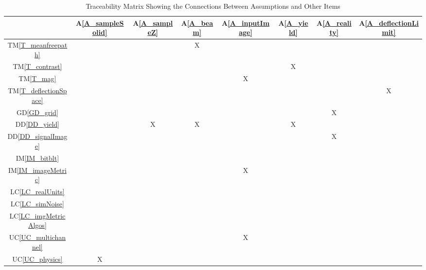 \documentclass[12pt]{article}
\newcommand{\dref}[1]{GD\ref{#1}}
\newcommand{\ddref}[1]{DD\ref{#1}}
\newcommand{\tref}[1]{TM\ref{#1}}
\newcommand{\aref}[1]{A\ref{#1}}
\newcommand{\iref}[1]{IM\ref{#1}}
\newcommand{\lcref}[1]{LC\ref{#1}}
\newcommand{\ucref}[1]{UC\ref{#1}}
\begin{document}
\begin{table}[h!]
\centering
\begin{tabular}{|c|c|c|c|c|c|c|c|}
\hline
	& \aref{A_sampleSolid}
	& \aref{A_sampleZ}
	& \aref{A_beam}
	& \aref{A_inputImage}
	& \aref{A_yield}
	& \aref{A_reality}
	& \aref{A_deflectionLimit}
\\ \hline
\tref{T_meanfreepath}      & & &X& & & & \\ \hline
\tref{T_contrast}          & & & & &X& & \\ \hline
\tref{T_mag}               & & & &X& & & \\ \hline
\tref{T_deflectionSpace}   & & & & & & &X\\ \hline
\dref{GD_grid}             & & & & & &X& \\ \hline
\ddref{DD_yield}           & &X&X& &X& & \\ \hline
\ddref{DD_signalImage}     & & & & & &X& \\ \hline
\iref{IM_bitblt}           & & & & & & & \\ \hline
\iref{IM_imageMetric}      & & & &X& & & \\ \hline
\lcref{LC_realUnits}       & & & & & & & \\ \hline
\lcref{LC_simNoise}        & & & & & & & \\ \hline
\lcref{LC_imgMetricAlgos}  & & & & & & & \\ \hline
\ucref{UC_multichannel}    & & & &X& & & \\ \hline
\ucref{UC_physics}         &X& & & & & & \\ \hline
\end{tabular}
\caption{Traceability Matrix Showing the Connections Between Assumptions and Other Items}
\label{Table:A_trace}
\end{table}
\end{document}

